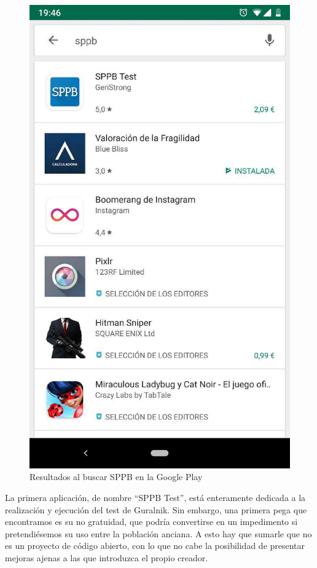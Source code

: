 \begin{figure}[H]
	\centering
	\includegraphics[scale=0.35]{imagenes/googlePlay_resultado.jpg}
	\caption{Resultados al buscar SPPB en la Google Play\label{fig:google_play}}
\end{figure}

La primera aplicación, de nombre ``SPPB Test''\cite{GeriStrong}, está enteramente dedicada a la realización y ejecución del test de Guralnik. Sin embargo, una primera pega que encontramos es su no gratuidad, que podría convertirse en un impedimento si pretendiésemos su uso entre la población anciana. A esto hay que sumarle que no es un proyecto de código abierto, con lo que no cabe la posibilidad de presentar mejoras ajenas a las que introduzca el propio creador.

